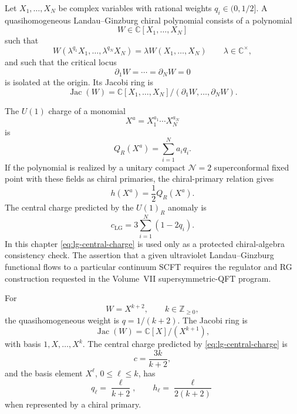 \begin{definition}
\label{def:quasihomogeneous-lg-chiral-polynomial}
Let \(X_1,\ldots,X_N\) be complex variables with rational weights
\(q_i\in(0,1/2]\).  A quasihomogeneous Landau--Ginzburg chiral polynomial consists
of a polynomial
\[
  W\in\mathbb C[X_1,\ldots,X_N]
\]
such that
\begin{equation}
  W(\lambda^{q_1}X_1,\ldots,\lambda^{q_N}X_N)=\lambda W(X_1,\ldots,X_N)
  \qquad
  \lambda\in\mathbb C^\times,
  \label{eq:lg-quasihomogeneous-condition}
\end{equation}
and such that the critical locus
\[
  \partial_1W=\cdots=\partial_NW=0
\]
is isolated at the origin.  Its Jacobi ring is
\begin{equation}
  \operatorname{Jac}(W)
  =
  \mathbb C[X_1,\ldots,X_N]/
  (\partial_1W,\ldots,\partial_NW).
  \label{eq:lg-jacobi-ring}
\end{equation}
\end{definition}

The \(U(1)\) charge of a monomial
\[
  X^a=X_1^{a_1}\cdots X_N^{a_N}
\]
is
\begin{equation}
  Q_R(X^a)=\sum_{i=1}^N a_iq_i.
  \label{eq:lg-monomial-r-charge}
\end{equation}
If the polynomial is realized by a unitary compact \(\mathcal N=2\)
superconformal fixed point with these fields as chiral primaries, the
chiral-primary relation gives
\begin{equation}
  h(X^a)=\frac12 Q_R(X^a).
  \label{eq:lg-chiral-weight-from-charge}
\end{equation}
The central charge predicted by the \(U(1)_R\) anomaly is
\begin{equation}
  c_{\mathrm{LG}}
  =
  3\sum_{i=1}^N (1-2q_i).
  \label{eq:lg-central-charge}
\end{equation}
In this chapter \eqref{eq:lg-central-charge} is used only as a protected
chiral-algebra consistency check.  The assertion that a given ultraviolet
Landau--Ginzburg functional flows to a particular continuum SCFT requires
the regulator and RG construction requested in the Volume~VII
supersymmetric-QFT program.

\begin{example}
\label{ex:a-series-lg-algebra}
For
\[
  W=X^{k+2},
  \qquad k\in\mathbb Z_{\ge0},
\]
the quasihomogeneous weight is \(q=1/(k+2)\).  The Jacobi ring is
\begin{equation}
  \operatorname{Jac}(W)
  =
  \mathbb C[X]/(X^{k+1}),
  \label{eq:a-series-jacobi-ring}
\end{equation}
with basis \(1,X,\ldots,X^k\).  The central charge predicted by
\eqref{eq:lg-central-charge} is
\begin{equation}
  c=\frac{3k}{k+2},
  \label{eq:a-series-lg-central-charge}
\end{equation}
and the basis element \(X^\ell\), \(0\le\ell\le k\), has
\begin{equation}
  q_\ell=\frac{\ell}{k+2},
  \qquad
  h_\ell=\frac{\ell}{2(k+2)}
  \label{eq:a-series-lg-chiral-weights}
\end{equation}
when represented by a chiral primary.
\end{example}

